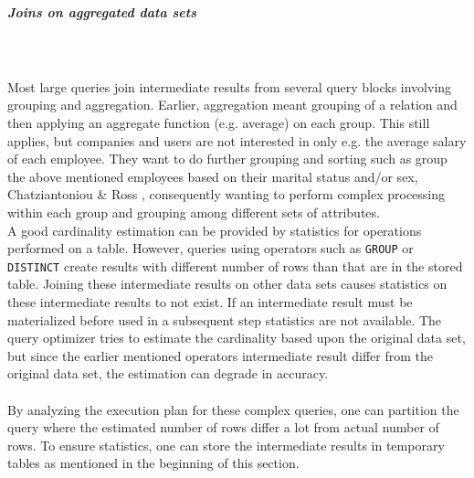 \documentclass{cslthse-msc}
\begin{document}
\subparagraph{Joins on aggregated data sets}\mbox{}\\\\
Most large queries join intermediate results from several query blocks involving grouping and aggregation. Earlier, aggregation meant grouping of a relation and then applying an aggregate function (e.g. average) on each group. This still applies, but companies and users are not interested in only e.g. the average salary of each employee. They want to do further grouping and sorting such as group the above mentioned employees based on their marital status and/or sex, Chatziantoniou \& Ross \cite{partioned}, consequently wanting to perform complex processing within each group and grouping among different sets of attributes.\\ A good cardinality estimation can be provided by statistics for operations performed on a table. However, queries using operators such as \texttt{GROUP} or \texttt{DISTINCT} create results with different number of rows than that are in the stored table. Joining these intermediate results on other data sets causes statistics on these intermediate results to not exist. If an intermediate result must be materialized before used in a subsequent step statistics are not available. The query optimizer tries to estimate the cardinality based upon the original data set, but since the earlier mentioned operators intermediate result differ from the original data set, the estimation can degrade in accuracy.\\\\ By analyzing the execution plan for these complex queries, one can partition the query where the estimated number of rows differ a lot from actual number of rows. To ensure statistics, one can store the intermediate results in temporary tables as mentioned in the beginning of this section.     
\end{document}

